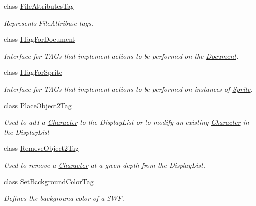 \begin{DoxyCompactItemize}
class \hyperlink{classjswf_1_1flash_1_1tags_1_1_file_attributes_tag}{File\+Attributes\+Tag}
\begin{DoxyCompactList}\small\item\em Represents {\ttfamily File\+Attribute} tags. \end{DoxyCompactList}\item 
class \hyperlink{classjswf_1_1flash_1_1tags_1_1_i_tag_for_document}{I\+Tag\+For\+Document}
\begin{DoxyCompactList}\small\item\em Interface for {\ttfamily T\+A\+G}s that implement actions to be performed on the \hyperlink{classjswf_1_1flash_1_1_document}{Document}. \end{DoxyCompactList}\item 
class \hyperlink{classjswf_1_1flash_1_1tags_1_1_i_tag_for_sprite}{I\+Tag\+For\+Sprite}
\begin{DoxyCompactList}\small\item\em Interface for {\ttfamily T\+A\+G}s that implement actions to be performed on instances of \hyperlink{classjswf_1_1flash_1_1_sprite}{Sprite}. \end{DoxyCompactList}\item 
class \hyperlink{classjswf_1_1flash_1_1tags_1_1_place_object2_tag}{Place\+Object2\+Tag}
\begin{DoxyCompactList}\small\item\em Used to add a {\ttfamily \hyperlink{classjswf_1_1flash_1_1_character}{Character}} to the {\ttfamily Display\+List} or to modify an existing {\ttfamily \hyperlink{classjswf_1_1flash_1_1_character}{Character}} in the {\ttfamily Display\+List} \end{DoxyCompactList}\item 
class \hyperlink{classjswf_1_1flash_1_1tags_1_1_remove_object2_tag}{Remove\+Object2\+Tag}
\begin{DoxyCompactList}\small\item\em Used to remove a {\ttfamily \hyperlink{classjswf_1_1flash_1_1_character}{Character}} at a given depth from the {\ttfamily Display\+List}. \end{DoxyCompactList}\item 
class \hyperlink{classjswf_1_1flash_1_1tags_1_1_set_background_color_tag}{Set\+Background\+Color\+Tag}
\begin{DoxyCompactList}\small\item\em Defines the background color of a S\+W\+F. \end{DoxyCompactList}\item 

\end{DoxyCompactItemize}
